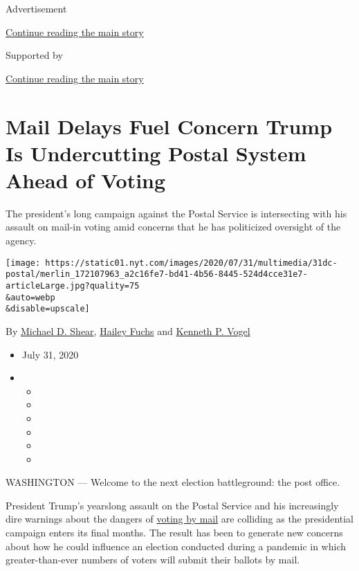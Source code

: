 Advertisement

\protect\hyperlink{after-top}{Continue reading the main story}

Supported by

\protect\hyperlink{after-sponsor}{Continue reading the main story}

\hypertarget{mail-delays-fuel-concern-trump-is-undercutting-postal-system-ahead-of-voting}{%
\section{Mail Delays Fuel Concern Trump Is Undercutting Postal System
Ahead of
Voting}\label{mail-delays-fuel-concern-trump-is-undercutting-postal-system-ahead-of-voting}}

The president's long campaign against the Postal Service is intersecting
with his assault on mail-in voting amid concerns that he has politicized
oversight of the agency.

\texttt{[image: https://static01.nyt.com/images/2020/07/31/multimedia/31dc-postal/merlin\_172107963\_a2c16fe7-bd41-4b56-8445-524d4cce31e7-articleLarge.jpg?quality=75\\\&auto=webp\\\&disable=upscale]}

By \href{https://www.nytimes.com/by/michael-d-shear}{Michael D. Shear},
\href{https://www.nytimes.com/by/hailey-fuchs}{Hailey Fuchs} and
\href{https://www.nytimes.com/by/kenneth-p-vogel}{Kenneth P. Vogel}

\begin{itemize}
\item
  July 31, 2020
\item
  \begin{itemize}
  \item
  \item
  \item
  \item
  \item
  \item
  \end{itemize}
\end{itemize}

WASHINGTON --- Welcome to the next election battleground: the post
office.

President Trump's yearslong assault on the Postal Service and his
increasingly dire warnings about the dangers of
\href{https://www.nytimes.com/2020/08/03/us/politics/trump-mail-in-voting.html}{voting
by mail} are colliding as the presidential campaign enters its final
months. The result has been to generate new concerns about how he could
influence an election conducted during a pandemic in which
greater-than-ever numbers of voters will submit their ballots by mail.

